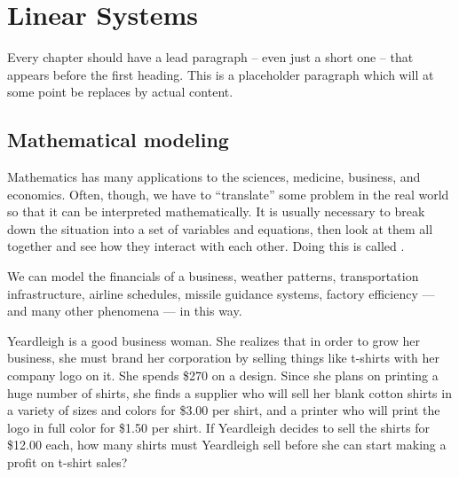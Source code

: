 \chapter{Linear Systems}
\label{ch:systems}

\newcommand{\linearsys}[2]{\left\{\begin{array}{l}#1\\#2\end{array}\right.}



Every chapter should have a lead paragraph -- even just a short one -- that appears before the first heading. This is a placeholder paragraph which will at some point be replaces by actual content.

\section{Mathematical modeling}
\label{sec:sysintro}

Mathematics has many applications to the sciences, medicine, business, and economics. Often, though, we have to ``translate'' some problem in the real world so that it can be interpreted mathematically. It is usually necessary to break down the situation into a set of variables and equations, then look at them all together and see how they interact with each other. Doing this is called .

We can model the financials of a business, weather patterns, transportation infrastructure, airline schedules, missile guidance systems, factory efficiency --- and many other phenomena --- in this way.

\begin{boxedexplore}
Yeardleigh is a good business woman. She realizes that in order to grow her business, she must brand her corporation by selling things like t-shirts with her company logo on it. She spends \$270 on a design. Since she plans on printing a huge number of shirts, she finds a supplier who will sell her blank cotton shirts in a variety of sizes and colors for \$3.00 per shirt, and a printer who will print the logo in full color for \$1.50 per shirt. If Yeardleigh decides to sell the shirts for \$12.00 each, how many shirts must Yeardleigh sell before she can start making a profit on t-shirt sales?
\end{boxedexplore}

